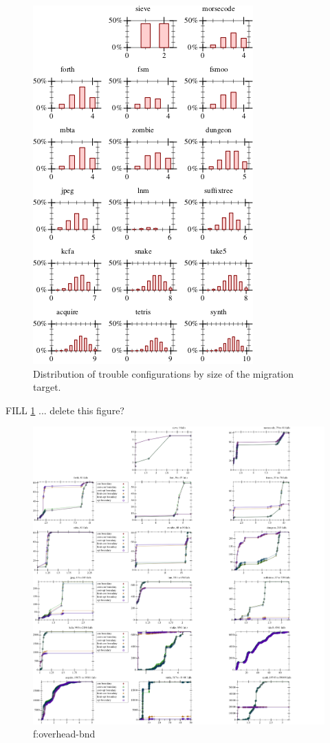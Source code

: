 \begin{figure}[t]
  \caption{Distribution of trouble configurations by size of the migration target.}
  \label{f:where-trouble}
  \includegraphics{data/where-trouble.pdf}
\end{figure}

FILL \cref{f:where-trouble}
... delete this figure?


\begin{figure}[t]
  \includegraphics[width=\textwidth]{data/cdf-overhead_boundary.pdf}
  \caption{f:overhead-bnd}
  \label{f:overhead-bnd}
\end{figure}

